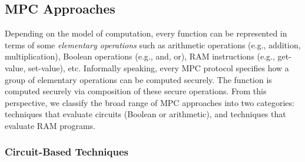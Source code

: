 \documentclass[11pt]{article}
\theoremstyle{plain}
\begin{document}
\subsection{MPC Approaches}

Depending on the model of computation, every function can be represented
in terms of some \emph{elementary operations} such as arithmetic operations
(e.g., addition, multiplication), Boolean operations (e.g., and, or),
RAM instructions (e.g., get-value, set-value), etc. Informally speaking,
every MPC protocol specifies how a group of elementary operations
can be computed securely. The function is computed securely via composition
of these secure operations. From this perspective, we classify the
broad range of MPC approaches into two categories: techniques that
evaluate circuits (Boolean or arithmetic), and techniques that evaluate
RAM programs.

\subsubsection{Circuit-Based Techniques}
\end{document}

